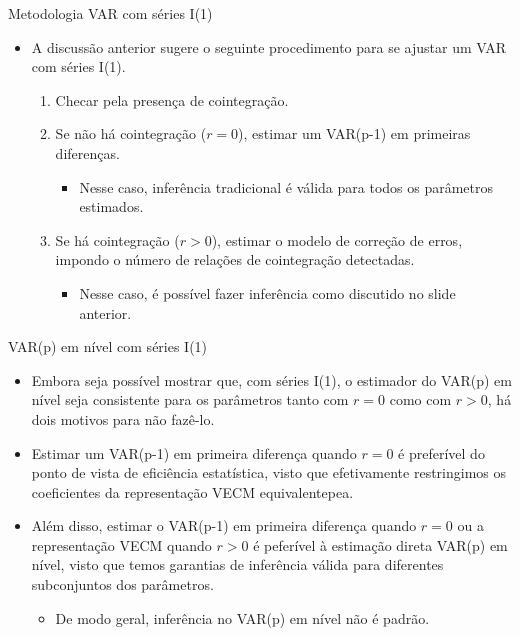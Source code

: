 \documentclass[11pt]{beamer}
\begin{document}
\begin{frame}{Metodologia VAR com séries I(1)}
\begin{itemize}
	\item A discussão anterior sugere o seguinte procedimento para se ajustar um VAR com séries I(1).
	\begin{enumerate}
		\item Checar pela presença de cointegração. 
		\item Se não há cointegração ($r=0$), estimar um VAR(p-1) em primeiras diferenças.
		\begin{itemize}
			\item Nesse caso, inferência tradicional é válida para todos os parâmetros estimados.
		\end{itemize}
		\item Se há cointegração ($r>0$), estimar o modelo de correção de erros, impondo o número de relações de cointegração detectadas.
		\begin{itemize}
			\item Nesse caso, é possível fazer inferência como discutido no slide anterior.
		\end{itemize}
	\end{enumerate}

\end{itemize}
\end{frame}
\begin{frame}{VAR(p) em nível com séries I(1)}
\begin{itemize}
	\item Embora seja possível mostrar que, com séries I(1), o estimador do VAR(p) em nível seja consistente para os parâmetros tanto com $r=0$ como com $r>0$, há dois motivos para não fazê-lo.
	\item Estimar um VAR(p-1) em primeira diferença quando $r=0$ é preferível do ponto de vista de eficiência estatística, visto que efetivamente restringimos os coeficientes da representação VECM equivalentepea.
\item Além disso, estimar o VAR(p-1) em primeira diferença quando $r=0$ ou a representação VECM quando $r>0$ é peferível à estimação direta VAR(p) em nível, visto que temos garantias de inferência válida para diferentes subconjuntos dos parâmetros.
\begin{itemize}
	\item De modo geral, inferência no VAR(p) em nível não é padrão.
\end{itemize}

\end{itemize}
\end{frame}
\end{document}
